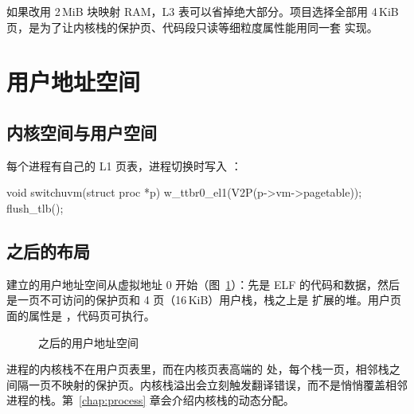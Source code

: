 如果改用 2\,MiB 块映射 RAM，L3 表可以省掉绝大部分。项目选择全部用 4\,KiB 页，是为了让内核栈的保护页、代码段只读等细粒度属性能用同一套  实现。

\section{用户地址空间}
\label{sec:uvm}

\subsection{内核空间与用户空间}

每个进程有自己的 L1 页表，进程切换时写入 ：

\begin{ccode}
void switchuvm(struct proc *p) {
  w_ttbr0_el1(V2P(p->vm->pagetable));
  flush_tlb();
}
\end{ccode}

\subsection{ 之后的布局}

 建立的用户地址空间从虚拟地址 0 开始（图~\ref{fig:uas}）：先是 ELF 的代码和数据，然后是一页不可访问的保护页和 4 页（16\,KiB）用户栈，栈之上是  扩展的堆。用户页面的属性是 ，代码页可执行。

\begin{figure}[htbp]
  \centering
  \caption{ 之后的用户地址空间}
  \label{fig:uas}
\end{figure}

进程的内核栈不在用户页表里，而在内核页表高端的  处，每个栈一页，相邻栈之间隔一页不映射的保护页。内核栈溢出会立刻触发翻译错误，而不是悄悄覆盖相邻进程的栈。第~\ref{chap:process} 章会介绍内核栈的动态分配。

